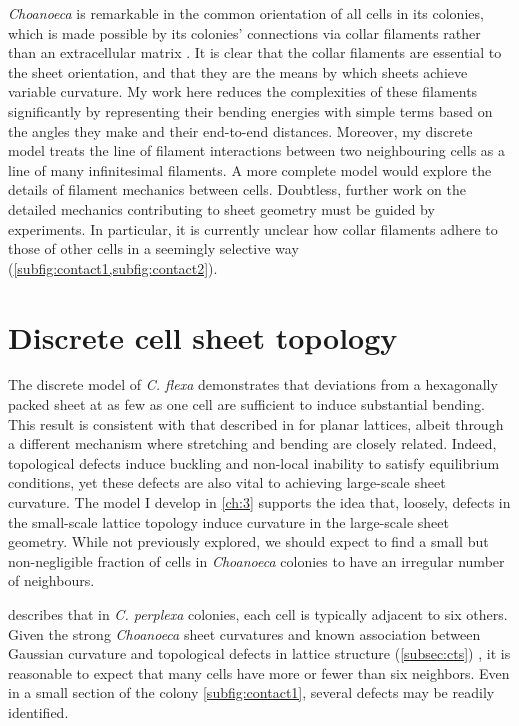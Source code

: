 \textit{Choanoeca} is remarkable in the common orientation of all cells in its colonies, which is made possible by its colonies' connections via collar filaments rather than an extracellular matrix \citep{leadbeater1983}. 
It is clear that the collar filaments are essential to the sheet orientation, and that they are the means by which sheets achieve variable curvature.
My work here reduces the complexities of these filaments significantly by representing their bending energies with simple terms based on the angles they make and their end-to-end distances.
Moreover, my discrete model treats the line of filament interactions between two neighbouring cells as a line of many infinitesimal filaments.
A more complete model would explore the details of filament mechanics between cells.
Doubtless, further work on the detailed mechanics contributing to sheet geometry must be guided by experiments.
In particular, it is currently unclear how collar filaments adhere to those of other cells in a seemingly selective way (\cref{subfig:contact1,subfig:contact2}).

\section{Discrete cell sheet topology}

The discrete model of \textit{C. flexa} demonstrates that deviations from a hexagonally packed sheet at as few as one cell are sufficient to induce substantial bending.
This result is consistent with that described in \citet{seung1988} for planar lattices, albeit through a different mechanism where stretching and bending are closely related.
Indeed, topological defects induce buckling and non-local inability to satisfy equilibrium conditions, yet these defects are also vital to achieving large-scale sheet curvature.
The model I develop in \cref{ch:3} supports the idea that, loosely, defects in the small-scale lattice topology induce curvature in the large-scale sheet geometry.
While not previously explored, we should expect to find a small but non-negligible fraction of cells in \textit{Choanoeca} colonies to have an irregular number of neighbours.

\citet{leadbeater1983} describes that in \textit{C. perplexa} colonies, each cell is typically adjacent to six others. 
Given the strong \textit{Choanoeca} sheet curvatures and known association between Gaussian curvature and topological defects in lattice structure (\cref{subsec:cts}) \citep{sachdev1984,seung1988}, it is reasonable to expect that many cells have more or fewer than six neighbors.
Even in a small section of the colony \cref{subfig:contact1}, several defects may be readily identified.

